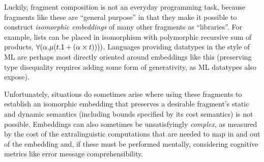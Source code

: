 \documentclass{llncs}
\begin{document}
Luckily, fragment composition is not an everyday programming task, because fragments like these are ``general purpose'' in that they make it possible to construct \emph{isomorphic embeddings} of many other fragments as ``libraries''. For example, lists can be placed in isomorphism with polymorphic recursive sum of products, $\forall(\alpha.\mu(t.{\sf 1} + (\alpha \times t))))$. Languages providing datatypes in the style of ML  are perhaps most directly oriented around embeddings like this (preserving type disequality requires adding some form of generativity, as ML datatypes also expose). %

Unfortunately, situations do sometimes arise where using these fragments to establish an isomorphic embedding that preserves a desirable fragment's  static and dynamic semantics (including bounds specified by its cost semantics) is not possible. 
Embeddings can also sometimes be unsatisfyingly \emph{complex}, as measured by the cost of the extralinguistic computations that are needed to map in and out of the embedding and, if these  must be performed mentally, considering  cognitive metrics like  error message comprehensibility. %
\end{document}

